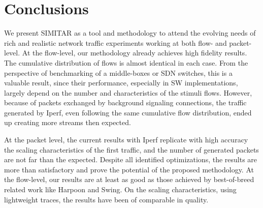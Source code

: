 \section{Conclusions}


We present SIMITAR as a tool and methodology to attend the evolving needs of rich and realistic network traffic experiments working at both flow-  and packet-level. At the flow-level, our methodology already achieves high fidelity results. The cumulative distribution of flows is almost identical in each case. From the perspective of benchmarking of a middle-boxes or SDN switches, this is a valuable result, since their performance, especially in SW implementations, largely depend on the number and characteristics of the stimuli flows. However, because of packets exchanged by background signaling connections, the traffic generated by Iperf, even following the same cumulative flow distribution, ended up creating more streams then expected.  

At the packet level, the current results with Iperf replicate with high accuracy the scaling characteristics of the first traffic, and the number of generated packets are not far than the expected.  Despite all identified optimizations, the results are more than satisfactory and prove the potential of the proposed methodology. At the flow-level, our results are at least as good as those achieved by best-of-breed related work like Harpoon and Swing.  On the scaling characteristics, using lightweight traces, the results have been of comparable in quality.

